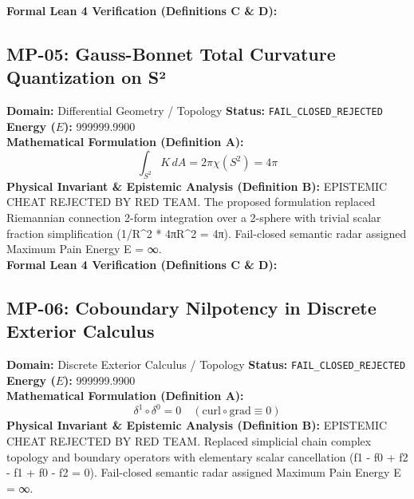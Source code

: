 \textbf{Formal Lean 4 Verification (Definitions C \& D):}


\vspace{1em}
\subsection{MP-05: Gauss-Bonnet Total Curvature Quantization on S²}
\textbf{Domain:} Differential Geometry / Topology \hfill \textbf{Status:} \texttt{FAIL\_CLOSED\_REJECTED} \hfill \textbf{Energy ($E$):} 999999.9900\\
\textbf{Mathematical Formulation (Definition A):}
\begin{equation*}
\int_{S^2} K\, dA = 2\pi \chi(S^2) = 4\pi
\end{equation*}
\textbf{Physical Invariant \& Epistemic Analysis (Definition B):}
EPISTEMIC CHEAT REJECTED BY RED TEAM. The proposed formulation replaced Riemannian connection 2-form integration over a 2-sphere with trivial scalar fraction simplification (1/R\textasciicircum{}2 * 4πR\textasciicircum{}2 = 4π). Fail-closed semantic radar assigned Maximum Pain Energy E = ∞.\\

\textbf{Formal Lean 4 Verification (Definitions C \& D):}


\vspace{1em}
\subsection{MP-06: Coboundary Nilpotency in Discrete Exterior Calculus}
\textbf{Domain:} Discrete Exterior Calculus / Topology \hfill \textbf{Status:} \texttt{FAIL\_CLOSED\_REJECTED} \hfill \textbf{Energy ($E$):} 999999.9900\\
\textbf{Mathematical Formulation (Definition A):}
\begin{equation*}
\delta^1 \circ \delta^0 = 0 \quad (\text{curl} \circ \text{grad} \equiv 0)
\end{equation*}
\textbf{Physical Invariant \& Epistemic Analysis (Definition B):}
EPISTEMIC CHEAT REJECTED BY RED TEAM. Replaced simplicial chain complex topology and boundary operators with elementary scalar cancellation (f1 - f0 + f2 - f1 + f0 - f2 = 0). Fail-closed semantic radar assigned Maximum Pain Energy E = ∞.\\

